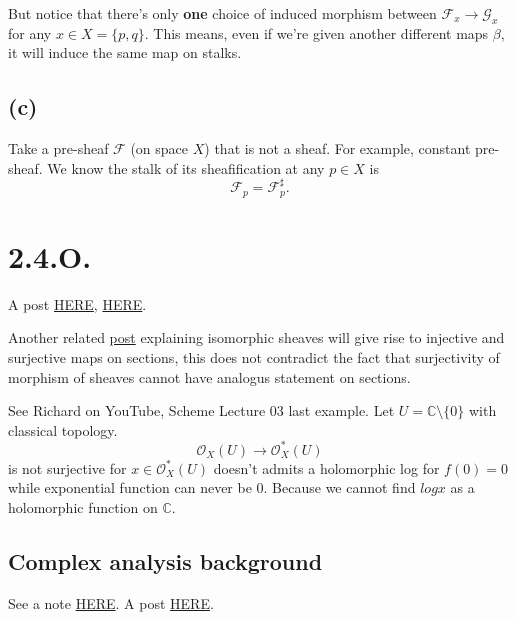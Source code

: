 But notice that there's only \textbf{one} choice of induced morphism between $\mathscr F_x\to\mathscr G_x$ for any $x\in X=\{p,q\}$. This means, even if we're given another different maps $\beta$, it will induce the same map on stalks.



\subsection{(c)}

Take a pre-sheaf $\mathscr F$ (on space $X$) that is not a sheaf. For example, constant pre-sheaf. We know the stalk of its sheafification at any $p\in X$ is 
\[\mathscr F_p=\mathscr F^{\sharp}_p.\]

\section{2.4.O.}

A post \href{https://math.stackexchange.com/questions/58306/examples-of-surjective-sheaf-morphisms-which-are-not-surjective-on-sections}{HERE}, \href{https://math.stackexchange.com/questions/232049/surjectivity-of-morphisms-of-sheaves-on-a-base}{HERE}.

Another related \href{https://math.stackexchange.com/questions/3939622/example-of-isomorphic-sheaves-whose-sections-arent-isomorphic}{post} explaining isomorphic sheaves will give rise to injective and surjective maps on sections, this does not contradict the fact that surjectivity of morphism of sheaves cannot have analogus statement on sections.

See Richard on YouTube, Scheme Lecture 03 last example. Let $U=\mathbb C\setminus \{0\}$ with classical topology. 
\[\mathscr O_X(U)\to\mathscr O_X^{\ast}(U)\] is not surjective for $x\in\mathscr O_X^{\ast}(U)$ doesn't admits a holomorphic log for $f(0)=0$ while exponential function can never be $0$. Because we cannot find $log x$ as a holomorphic function on $\mathbb C$.

\subsection{Complex analysis background}

See a note \href{https://math.berkeley.edu/~vvdatar/m185f16/notes/Lecture-15_Logarithm.pdf}{HERE}. 
A post \href{https://math.stackexchange.com/questions/1803352/why-cant-we-define-a-branch-of-log-fz-in-the-whole-complex-plane}{HERE}.

